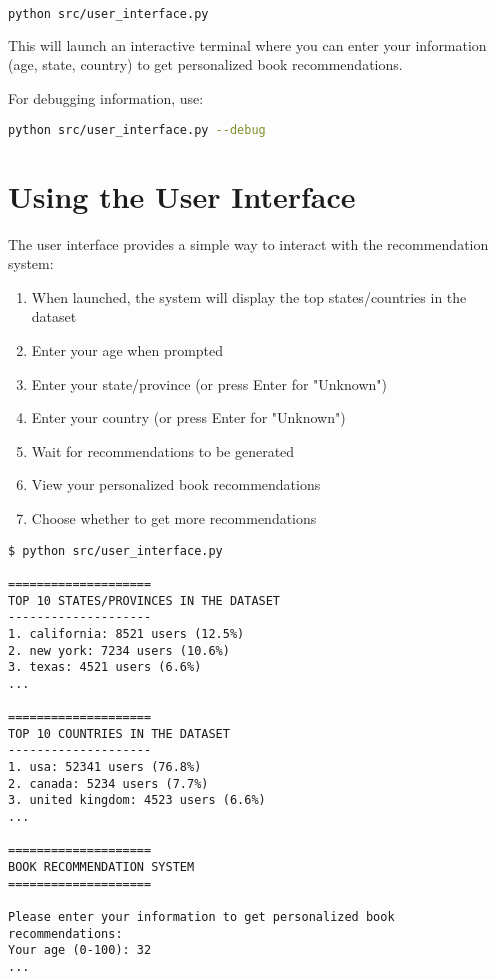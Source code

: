 \documentclass[12pt, a4paper, oneside]{book}
\begin{document}
\begin{lstlisting}[language=bash]
python src/user_interface.py
\end{lstlisting}

This will launch an interactive terminal where you can enter your information (age, state, country) to get personalized book recommendations.

For debugging information, use:

\begin{lstlisting}[language=bash]
python src/user_interface.py --debug
\end{lstlisting}

\section{Using the User Interface}
The user interface provides a simple way to interact with the recommendation system:

\begin{enumerate}
    \item When launched, the system will display the top states/countries in the dataset
    \item Enter your age when prompted
    \item Enter your state/province (or press Enter for "Unknown")
    \item Enter your country (or press Enter for "Unknown")
    \item Wait for recommendations to be generated
    \item View your personalized book recommendations
    \item Choose whether to get more recommendations
\end{enumerate}

\begin{tcolorbox}[title=Example Session]
\begin{verbatim}
$ python src/user_interface.py

====================
TOP 10 STATES/PROVINCES IN THE DATASET
--------------------
1. california: 8521 users (12.5%)
2. new york: 7234 users (10.6%)
3. texas: 4521 users (6.6%)
...

====================
TOP 10 COUNTRIES IN THE DATASET
--------------------
1. usa: 52341 users (76.8%)
2. canada: 5234 users (7.7%)
3. united kingdom: 4523 users (6.6%)
...

====================
BOOK RECOMMENDATION SYSTEM
====================

Please enter your information to get personalized book recommendations:
Your age (0-100): 32
...
\end{verbatim}
\end{tcolorbox}
\end{document}
